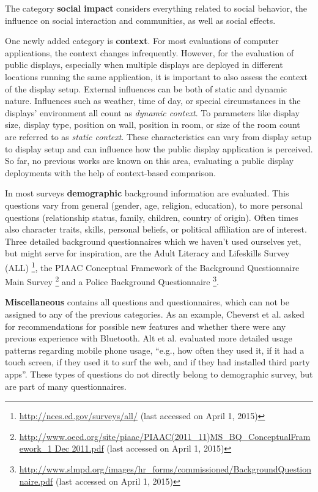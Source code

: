 		The category \textbf{social impact} considers everything related to social behavior, the influence on social interaction and communities, as well as social effects.


	One newly added category is \textbf{context}. For most evaluations of computer applications, the context changes infrequently. However, for the evaluation of public displays, especially when multiple displays are deployed in different locations running the same application, it is important to also assess the context of the display setup. External influences can be both of static and dynamic nature. Influences such as weather, time of day, or special circumstances in the displays' environment all count as \textit{dynamic context}. To parameters like display size, display type, position on wall, position in room, or size of the room count are referred to as \textit{static context}. These characteristics can vary from display setup to display setup and can influence how the public display application is perceived.
	So far, no previous works are known on this area, evaluating a public display deployments with the help of context-based comparison. 

	In most surveys \textbf{demographic} background information are evaluated. This questions vary from general (gender, age, religion, education), to more personal questions (relationship status, family, children, country of origin). Often times also character traits, skills, personal beliefs, or political affiliation are of interest.
	Three detailed background questionnaires which we haven't used ourselves yet, but might serve for inspiration, are the Adult Literacy and Lifeskills Survey (ALL) \footnote{\url{http://nces.ed.gov/surveys/all/} (last accessed on April 1, 2015)}, the PIAAC Conceptual Framework of the Background Questionnaire Main Survey \footnote{\url{http://www.oecd.org/site/piaac/PIAAC(2011_11)MS_BQ_ConceptualFramework_1 Dec 2011.pdf} (last accessed on April 1, 2015)} and a Police Background Questionnaire \footnote{\url{http://www.slmpd.org/images/hr_forms/commissioned/BackgroundQuestionnaire.pdf} (last accessed on April 1, 2015)}.

	\textbf{Miscellaneous} contains all questions and questionnaires, which can not be assigned to any of the previous categories. As an example, Cheverst et al. \cite{cheverst2005hermes} asked for recommendations for possible new features and whether there were any previous experience with Bluetooth. Alt et al. \cite{alt2011digifieds} evaluated more detailed usage patterns regarding mobile phone usage, ``e.g., how often they used it, if it had a touch screen, if they used it to surf the web, and if they had installed third party apps''. These types of questions do not directly belong to demographic survey, but are part of many questionnaires.








